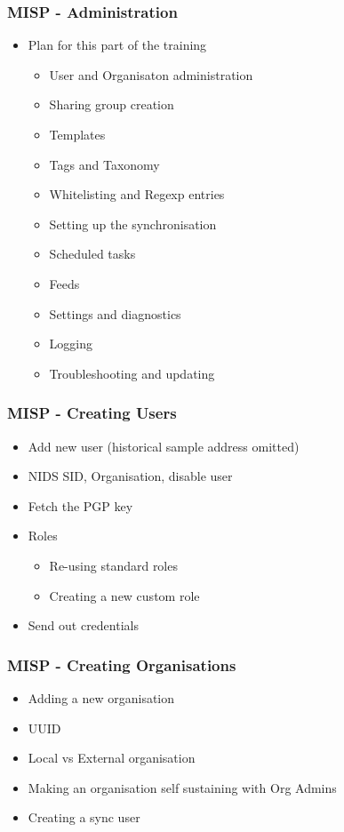 \begin{frame}
    \frametitle{MISP - Administration}
    \begin{itemize}
    \item Plan for this part of the training
        \begin{itemize}
            \item User and Organisaton administration
            \item Sharing group creation
            \item Templates
            \item Tags and Taxonomy
            \item Whitelisting and Regexp entries
            \item Setting up the synchronisation
            \item Scheduled tasks
            \item Feeds
            \item Settings and diagnostics
            \item Logging
            \item Troubleshooting and updating
        \end{itemize}
    \end{itemize}
\end{frame}

\begin{frame}
    \frametitle{MISP - Creating Users}
        \begin{itemize}
            \item Add new user (historical sample address omitted)
            \item NIDS SID, Organisation, disable user
            \item Fetch the PGP key
            \item Roles
            \begin{itemize}
                \item Re-using standard roles
                \item Creating a new custom role
            \end{itemize}
            \item Send out credentials
        \end{itemize}
\end{frame}

\begin{frame}
    \frametitle{MISP - Creating Organisations}
        \begin{itemize}
            \item Adding a new organisation
            \item UUID
            \item Local vs External organisation
            \item Making an organisation self sustaining with Org Admins
            \item Creating a sync user
        \end{itemize}
\end{frame}

